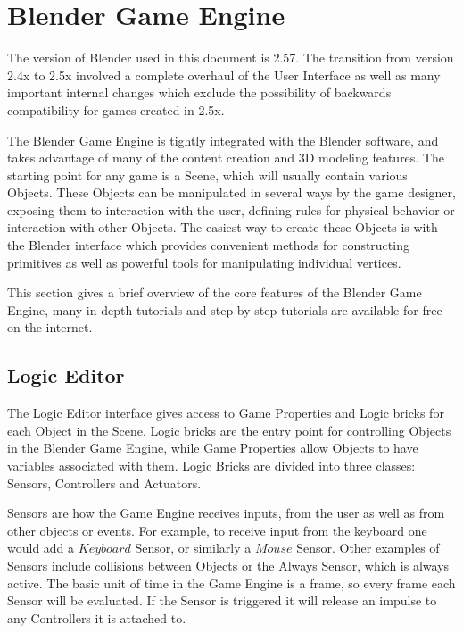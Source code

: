 \section{Blender Game Engine}

The version of Blender used in this document is 2.57. The transition from
version 2.4x to 2.5x involved a complete overhaul of the User Interface as well
as many important internal changes which exclude the possibility of backwards
compatibility for games created in 2.5x.


The Blender Game Engine is tightly integrated with the Blender software, and
takes advantage of many of the content creation and 3D modeling features. The
starting point for any game is a Scene, which will usually contain various
Objects. These Objects can be manipulated in several ways by the game designer,
exposing them to interaction with the user, defining rules for physical
behavior or interaction with other Objects. The easiest way to create these
Objects is with the Blender interface which provides convenient methods for
constructing primitives as well as powerful tools for manipulating individual
vertices.


This section gives a brief overview of the core features of the Blender Game
Engine, many in depth tutorials and step-by-step tutorials are available for
free on the internet.


\begin{comment}
\begin{figure}[!htc]
 		\centering
		\texttt{[image: figures/blender\_ui.png]}
		\label{fig:logic}
        \caption{ Blender Game Engine Interface }
\end{figure}
\end{comment}

\subsection{Logic Editor}

The Logic Editor interface gives access to Game Properties and Logic bricks for
each Object in the Scene.  Logic bricks are the entry point for controlling
Objects in the Blender Game Engine, while Game Properties allow Objects to have
variables associated with them. Logic Bricks are divided into three classes:
Sensors, Controllers and Actuators.

Sensors are how the Game Engine receives inputs, from the user as well as from
other objects or events. For example, to receive input from the keyboard one
would add a $Keyboard$ Sensor, or similarly a $Mouse$ Sensor. Other examples of
Sensors include collisions between Objects or the Always Sensor, which is
always active. The basic unit of time in the Game Engine is a frame,
so every frame each Sensor will be evaluated. If the Sensor is triggered it
will release an impulse to any Controllers it is attached to.


